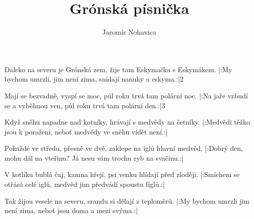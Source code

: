 \beginsong

\title{Grónská písnička}
\author{Jaromír Nohavica}

\beginverse
{}Daleko na severu je Grónská zem,
žije tam Eskymačka s Eskymákem.
|:My bychom umrzli, jim není zima,
snídají nanuky a eskyma.:|{2}
\endverse

\beginverse
Mají se bezvadně, vyspí se moc,
půl roku trvá tam polární noc.
|:Na jaře vzbudí se a vyběhnou ven,
půl roku trvá tam polární den.:|3
\endverse

\beginverse
Když sněhu napadne nad kotníky,
hrávají s medvědy na četníky.
|:Medvědi těžko jsou k poražení,
neboť medvědy ve sněhu vidět není.:|
\endverse

\beginverse
Pokaždé ve středu, přesně ve dvě,
zaklepe na iglů hlavní medvěd.
|:Dobrý den, mohu dál na vteřinu?
Já nesu vám trochu ryb na svačinu.:|
\endverse

\beginverse
V kotlíku bublá čaj, kamna hřejí,
psi venku hlídají před zloději.
|:Smíchem se otřásá celé iglů,
medvěd jim předvádí spoustu fíglů.:|
\endverse

\beginverse
Tak žijou vesele na severu,
srandu si dělají z teploměrů.
|:My bychom umrzli jim není zima,
neboť jsou doma a mezi svýma.:|{}
\endverse


